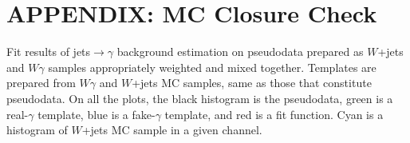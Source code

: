 \chapter{APPENDIX: MC Closure Check}
\label{sec:MCclosureCheck}

Fit results of jets$ \rightarrow \gamma$ background estimation on pseudodata prepared as $W$+jets and $W\gamma$ samples appropriately weighted and mixed together. Templates are prepared from $W\gamma$ and $W$+jets MC samples, same as those that constitute pseudodata. On all the plots, the black histogram is the pseudodata, green is a real-$\gamma$ template, blue is a fake-$\gamma$ template, and red is a fit function. Cyan is a histogram of $W$+jets MC sample in a given channel. 



